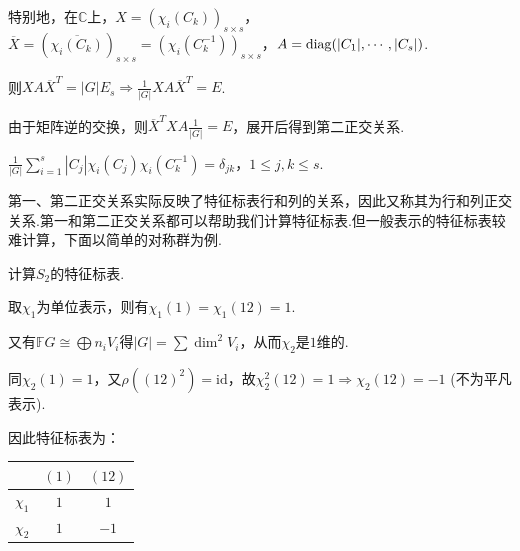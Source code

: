 特别地，在$\mathbb{C}$上，$X=(\chi_i(C_k))_{s\times s}$，$\overline{X} = (\overline{\chi_i(C_k)})_{s\times s} = (\chi_i(C_k^{-1}))_{s\times s}$，$A=\operatorname{diag}(|C_1|,\cdots,|C_s|)$.\par
则$XA\overline{X}^T=|G|E_s \Rightarrow \frac{1}{|G|}XA\overline{X}^T = E$.\par
由于矩阵逆的交换，则$\overline{X}^T X A\frac{1}{|G|}=E$，展开后得到第二正交关系.

\begin{theorem}[第二正交关系]
    $\frac{1}{|G|}\sum_{i=1}^s |C_j|\chi_i(C_j)\chi_i(C_k^{-1}) = \delta_{jk}$，$1\leqslant j,k\leqslant s$.
\end{theorem}

第一、第二正交关系实际反映了特征标表行和列的关系，因此又称其为行和列正交关系.第一和第二正交关系都可以帮助我们计算特征标表.但一般表示的特征标表较难计算，下面以简单的对称群为例.

\begin{instance}
    计算$S_2$的特征标表.\par
    取$\chi_1$为单位表示，则有$\chi_1(1)=\chi_1(12)=1$.\par
    又有$\mathbb{F}G \cong \bigoplus n_iV_i$得$|G| = \sum \dim^2 V_i$，从而$\chi_2$是$1$维的.\par
    同$\chi_2(1)=1$，又$\rho((12)^2)=\mathrm{id}$，故$\chi_2^2(12)=1 \Rightarrow \chi_2(12)=-1$ (不为平凡表示).\par
    因此特征标表为：
    \begin{center}
        \begin{tabular}{c|cc}
                     & $(1)$ & $(12)$ \\ \hline
            $\chi_1$ & $1$   & $1$    \\
            $\chi_2$ & $1$   & $-1$   
        \end{tabular}
    \end{center}
\end{instance}

